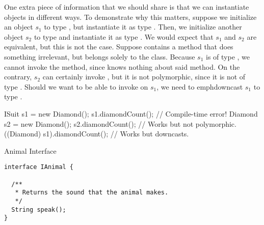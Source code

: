 One extra piece of information that we should share is that we can instantiate objects in different ways. To demonstrate why this matters, suppose we initialize an object $s_1$ to type , but instantiate it as type . Then, we initialize another object $s_2$ to type  and instantiate it as type . We would expect that $s_1$ and $s_2$ are equivalent, but this is not the case. Suppose  contains a method  that does something irrelevant, but belongs solely to the  class. Because $s_1$ is of type , we cannot invoke the  method, since  knows nothing about said method. On the contrary, $s_2$ can certainly invoke , but it is not polymorphic, since it is not of type . Should we want to be able to invoke  on $s_1$, we need to emph{downcast} $s_1$ to type .

\begin{verbnobox}[\small]
ISuit s1 = new Diamond();
s1.diamondCount();             // Compile-time error!
Diamond s2 = new Diamond();
s2.diamondCount();             // Works but not polymorphic.
((Diamond) s1).diamondCount(); // Works but downcasts.
\end{verbnobox}


\begin{cl}[]{Animal Interface}
\begin{lstlisting}[language=MyJava]
interface IAnimal {

  /**
   * Returns the sound that the animal makes.
   */
  String speak();
}
\end{lstlisting}
\end{cl}

